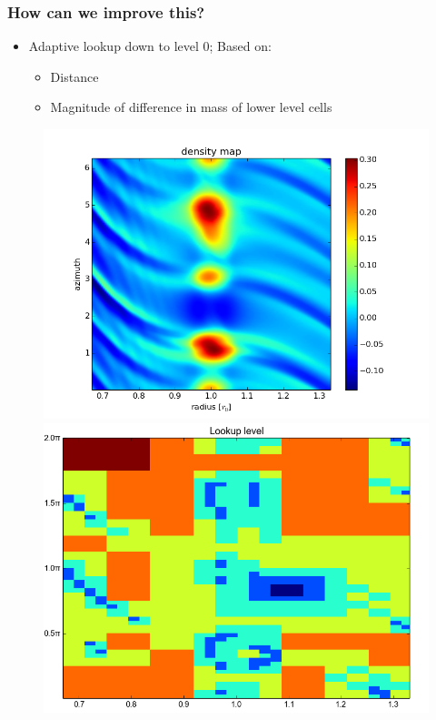 \documentclass{beamer}
\begin{document}
\begin{frame}
 \frametitle{How can we improve this?}
\begin{itemize}
  \item Adaptive lookup down to level 0; Based on:
  \begin{itemize} 
  \item Distance
  \item Magnitude of difference in mass of lower level cells
  \end{itemize}
 \end{itemize}

 \begin{figure}[H]
  \centering
  \includegraphics[width=.4\textwidth]{density.png}     \includegraphics[width=.35\textwidth]{../../../Sara/run/default/debug_level-euclid.png}
\end{figure}
\end{frame}
\end{document}
